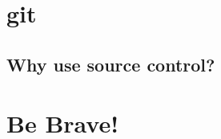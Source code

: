 \documentclass{beamer}
\begin{document}
% 

\section{git}
\subsection[Why Source Control?]{Why use source control?}

\section*{Be Brave!}

% 
% 
% 
\end{document}
